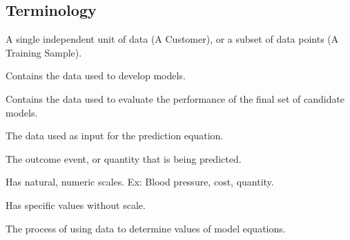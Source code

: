 \documentclass[../main.tex]{subfiles}
\begin{document}
\subsection{Terminology}
    \begin{definition}
        A single independent unit of data (A Customer), or a subset of data points (A Training Sample).
    \end{definition}
    \begin{definition}
        Contains the data used to develop models.
    \end{definition}
    \begin{definition}
        Contains the data used to evaluate the performance of the final set of candidate models.
    \end{definition}
    \begin{definition}
        The data used as input for the prediction equation.
    \end{definition}
    \begin{definition}
        The outcome event, or quantity that is being predicted.
    \end{definition}
    \begin{definition}
        Has natural, numeric scales. Ex: Blood pressure, cost, quantity. 
    \end{definition}
    \begin{definition}
        Has specific values without scale.
    \end{definition}
    \begin{definition}
        The process of using data to determine values of model equations.
    \end{definition}
\end{document}
